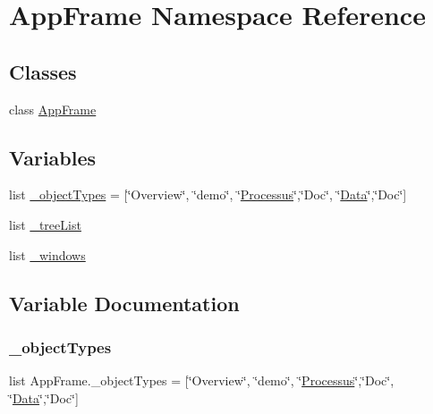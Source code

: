\hypertarget{namespaceAppFrame}{}\section{App\+Frame Namespace Reference}
\label{namespaceAppFrame}
\subsection*{Classes}
\begin{DoxyCompactItemize}
\item 
class \hyperlink{classAppFrame_1_1AppFrame}{App\+Frame}
\end{DoxyCompactItemize}
\subsection*{Variables}
\begin{DoxyCompactItemize}
\item 
list \hyperlink{namespaceAppFrame_a921dc579fcc14d88b97555c36d7ab2f6}{\+\_\+object\+Types} = \mbox{[}\char`\"{}Overview\char`\"{}, \char`\"{}demo\char`\"{}, \char`\"{}\hyperlink{classProcessus}{Processus}\char`\"{},\char`\"{}Doc\char`\"{}, \char`\"{}\hyperlink{classData}{Data}\char`\"{},\char`\"{}Doc\char`\"{}\mbox{]}
\item 
list \hyperlink{namespaceAppFrame_a8925d0dfd02fc868328ba29c830445db}{\+\_\+tree\+List}
\item 
list \hyperlink{namespaceAppFrame_a027b5aeacdf457fd7ca6f3303fe51985}{\+\_\+windows}
\end{DoxyCompactItemize}


\subsection{Variable Documentation}
\mbox{\label{namespaceAppFrame_a921dc579fcc14d88b97555c36d7ab2f6}} 
\subsubsection{\texorpdfstring{\+\_\+object\+Types}{\_objectTypes}}
{\footnotesize\ttfamily list App\+Frame.\+\_\+object\+Types = \mbox{[}\char`\"{}Overview\char`\"{}, \char`\"{}demo\char`\"{}, \char`\"{}\hyperlink{classProcessus}{Processus}\char`\"{},\char`\"{}Doc\char`\"{}, \char`\"{}\hyperlink{classData}{Data}\char`\"{},\char`\"{}Doc\char`\"{}\mbox{]}\hspace{0.3cm}{\ttfamily [private]}}




